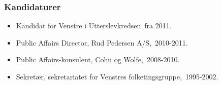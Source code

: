 \documentclass[11pt, a4paper]{awesome-cv}
\begin{document}
\begin{cvletter}
\subsubsection*{Kandidaturer}
\begin{itemize}
\item Kandidat for Venstre i Utterslevkredsen fra 2011.
\end{itemize}
\begin{itemize}
\item Public Affairs Director, Rud Pedersen A/S, 2010-2011.
\item Public Affairs-konsulent, Cohn og Wolfe, 2008-2010.
\item Sekretær, sekretariatet for Venstres folketingsgruppe, 1995-2002.
\end{itemize}
\end{cvletter}
\end{document}
